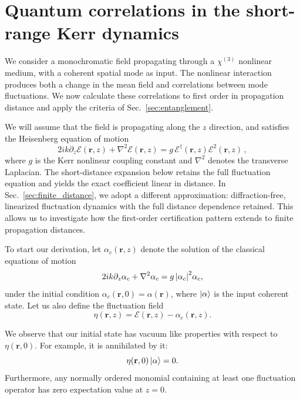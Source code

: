 \documentclass[%
 reprint,
 amsmath,amssymb,
 aps,
pra,
twocolumn,
]{revtex4-2}
\begin{document}
\section{Quantum correlations in the short-range Kerr dynamics}

\label{sec:Kerr}

We consider a monochromatic field propagating through a $\chi^{(3)}$ nonlinear medium, with a coherent spatial mode as input. The nonlinear interaction produces both a change in the mean field and correlations between mode fluctuations. We now calculate these correlations to first order in propagation distance and apply the criteria of Sec.~\ref{sec:entanglement}.

We will assume that the field is propagating along the $z$ direction,
and satisfies the Heisenberg equation of motion
%
\begin{equation}
    \label{eq:heisenberg_equation}
    2ik \partial_z \mathcal{E}(\mathbf{r}, z) + \nabla^2 \mathcal{E}(\mathbf{r}, z) = g\, \mathcal{E}^\dagger(\mathbf{r}, z) \mathcal{E}^2 (\mathbf{r}, z)\,,
\end{equation}
%
where $g$ is the Kerr nonlinear coupling constant and $\nabla^2$ denotes the transverse Laplacian. The short-distance expansion below retains the full fluctuation equation and yields the exact coefficient linear in distance. In Sec.~\ref{sec:finite_distance}, we adopt a different approximation: diffraction-free, linearized fluctuation dynamics with the full distance dependence retained. This allows us to investigate how the first-order certification pattern extends to finite propagation distances.

To start our derivation, let $\alpha_c(\mathbf{r}, z)$ denote the solution of the classical equations of motion
\begin{equation}
    2ik \partial_z \alpha_c + \nabla^2 \alpha_c = g\, \abs{\alpha_c}^2 \alpha_c,
\end{equation}
under the initial condition $\alpha_c(\mathbf{r}, 0) = \alpha(\mathbf{r})$, where $\ket{\alpha}$ is the input coherent state. Let us also define the fluctuation field
\begin{equation}
    \eta(\mathbf{r}, z) = \mathcal{E}(\mathbf{r}, z) - \alpha_c(\mathbf{r}, z).
\end{equation}

We observe that our initial state has vacuum like properties with respect to $\eta(\mathbf{r}, 0)$. For example, it is annihilated by it:
\begin{equation}
    \eta(\mathbf{r}, 0) \ket{\alpha} = 0.
\end{equation}
Furthermore, any normally ordered monomial containing at least one fluctuation operator has zero expectation value at $z=0$.
\end{document}
